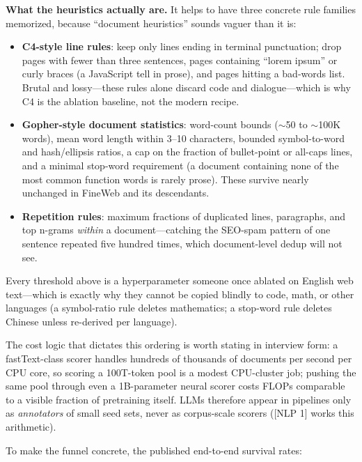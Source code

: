 \textbf{What the heuristics actually are.} It helps to have three concrete rule families memorized, because ``document heuristics'' sounds vaguer than it is:
\begin{itemize}
    \item \textbf{C4-style line rules}: keep only lines ending in terminal punctuation; drop pages with fewer than three sentences, pages containing ``lorem ipsum'' or curly braces (a JavaScript tell in prose), and pages hitting a bad-words list. Brutal and lossy---these rules alone discard code and dialogue---which is why C4 is the ablation baseline, not the modern recipe.
    \item \textbf{Gopher-style document statistics}: word-count bounds ($\sim$50 to $\sim$100K words), mean word length within 3--10 characters, bounded symbol-to-word and hash/ellipsis ratios, a cap on the fraction of bullet-point or all-caps lines, and a minimal stop-word requirement (a document containing none of the most common function words is rarely prose). These survive nearly unchanged in FineWeb and its descendants.
    \item \textbf{Repetition rules}: maximum fractions of duplicated lines, paragraphs, and top n-grams \textit{within} a document---catching the SEO-spam pattern of one sentence repeated five hundred times, which document-level dedup will not see.
\end{itemize}
Every threshold above is a hyperparameter someone once ablated on English web text---which is exactly why they cannot be copied blindly to code, math, or other languages (a symbol-ratio rule deletes mathematics; a stop-word rule deletes Chinese unless re-derived per language).

The cost logic that dictates this ordering is worth stating in interview form: a fastText-class scorer handles hundreds of thousands of documents per second per CPU core, so scoring a 100T-token pool is a modest CPU-cluster job; pushing the same pool through even a 1B-parameter neural scorer costs FLOPs comparable to a visible fraction of pretraining itself. LLMs therefore appear in pipelines only as \textit{annotators} of small seed sets, never as corpus-scale scorers ([NLP 1] works this arithmetic).

To make the funnel concrete, the published end-to-end survival rates:

